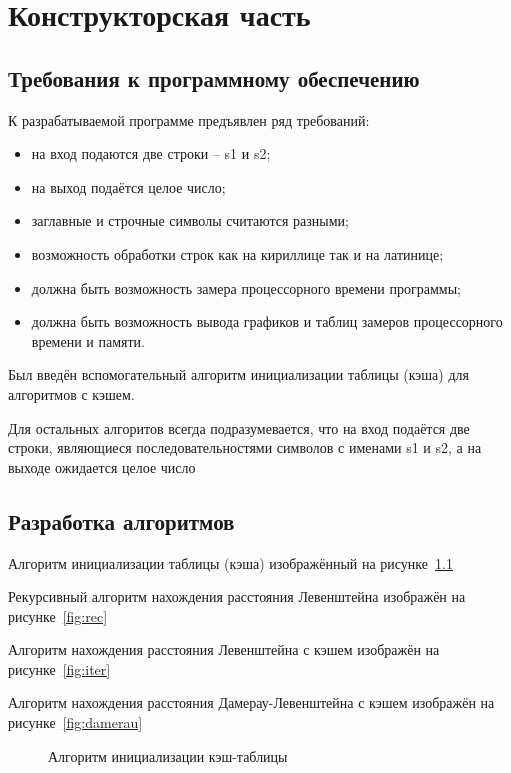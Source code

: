 \chapter{Конструкторская часть}

\section{Требования к программному обеспечению}

К разрабатываемой программе предъявлен ряд требований:

\begin{itemize}
	\item на вход подаются две строки -- s1 и s2;
	\item на выход подаётся целое число;
	\item заглавные и строчные символы считаются разными;
	\item возможность обработки строк как на кириллице так и на латинице;
	\item должна быть возможность замера процессорного времени программы;
	\item должна быть возможность вывода графиков и таблиц замеров процессорного времени и памяти.
\end{itemize}

Был введён вспомогательный алгоритм инициализации таблицы (кэша) для алгоритмов с кэшем.

Для остальных алгоритов всегда подразумевается, что на вход подаётся две строки, являющиеся последовательностями символов с именами s1 и s2, а на выходе ожидается целое число

\section{Разработка алгоритмов}

Алгоритм инициализации таблицы (кэша) изображённый на рисунке~\ref{fig:fill}

Рекурсивный алгоритм нахождения расстояния Левенштейна изображён на рисунке~\ref{fig:rec}

Алгоритм нахождения расстояния Левенштейна с кэшем изображён на рисунке~\ref{fig:iter}

Алгоритм нахождения расстояния Дамерау-Левенштейна с кэшем изображён на рисунке~\ref{fig:damerau}

\begin{figure}
	\centering
	
	\caption{Алгоритм инициализации кэш-таблицы}
	\label{fig:fill}
\end{figure}

